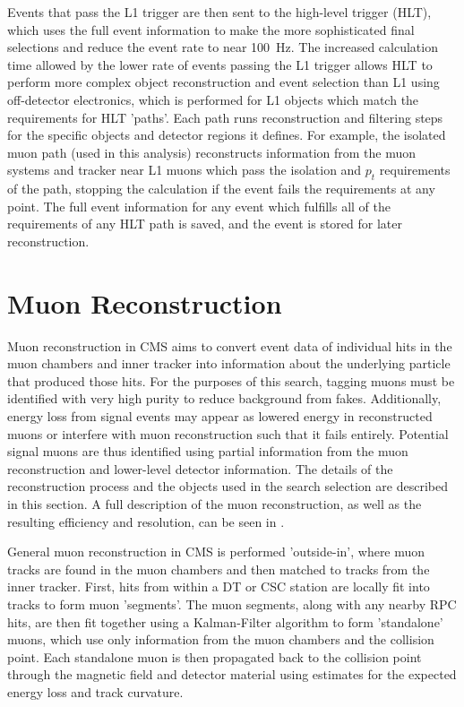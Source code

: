 Events that pass the L1 trigger are then sent to the high-level trigger (HLT), which uses the full event information to make the more sophisticated final selections and reduce the event rate to near \SI{100}{\hertz}.
The increased calculation time allowed by the lower rate of events passing the L1 trigger allows HLT to perform more complex object reconstruction and event selection than L1 using off-detector electronics, which is performed for L1 objects which match the requirements for HLT 'paths'.
Each path runs reconstruction and filtering steps for the specific objects and detector regions it defines.
For example, the isolated muon path (used in this analysis) reconstructs information from the muon systems and tracker near L1 muons which pass the isolation and $p_t$ requirements of the path, stopping the calculation if the event fails the requirements at any point.
The full event information for any event which fulfills all of the requirements of any HLT path is saved, and the event is stored for later reconstruction.

\section{Muon Reconstruction}
\label{sec:muonReco}
Muon reconstruction in CMS aims to convert event data of individual hits in the muon chambers and inner tracker into information about the underlying particle that produced those hits.
For the purposes of this search, tagging muons must be identified with very high purity to reduce background from fakes. 
Additionally, energy loss from signal events may appear as lowered energy in reconstructed muons or interfere with muon reconstruction such that it fails entirely.
Potential signal muons are thus identified using partial information from the muon reconstruction and lower-level detector information.
The details of the reconstruction process and the objects used in the search selection are described in this section.
A full description of the muon reconstruction, as well as the resulting efficiency and resolution, can be seen in \cite{cmsMuonPerformance}.

General muon reconstruction in CMS is performed 'outside-in', where muon tracks are found in the muon chambers and then matched to tracks from the inner tracker.
First, hits from within a DT or CSC station are locally fit into tracks to form muon 'segments'.
The muon segments, along with any nearby RPC hits, are then fit together using a Kalman-Filter algorithm to form 'standalone' muons, which use only information from the muon chambers and the collision point.
Each standalone muon is then propagated back to the collision point through the magnetic field and detector material using estimates for the expected energy loss and track curvature.

